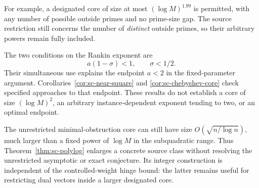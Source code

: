 For example, a designated core of size at most \((\log M)^{1.99}\)
is permitted, with any number of possible outside primes and no
prime-size gap. The source restriction still concerns the number
of \emph{distinct} outside primes, so their arbitrary powers remain
fully included.

The two conditions on the Rankin exponent are
\[
 a(1-\sigma)<1,\qquad \sigma<1/2.
\]
Their simultaneous use explains the endpoint \(a<2\) in the
fixed-parameter argument. Corollaries~\ref{cor:sc-near-square}
and \ref{cor:sc-chebyshev-core} check specified approaches to
that endpoint. These results do not
establish a core of size \((\log M)^2\), an arbitrary
instance-dependent exponent tending to two, or an optimal endpoint.

The unrestricted minimal-obstruction core can still have size
\(O(\sqrt{n/\log n})\), much larger than a fixed power of
\(\log M\) in the subquadratic range. Thus
Theorem~\ref{thm:sc-polylog} enlarges a concrete source class
without resolving the unrestricted asymptotic or exact conjecture.
Its integer construction is independent of the controlled-weight
hinge bound: the latter remains useful for restricting dual vectors
inside a larger designated core.

